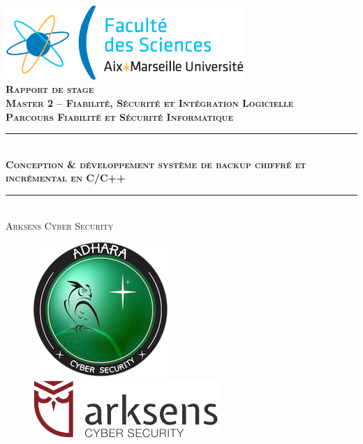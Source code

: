 \documentclass[a4paper,10pt, twoside]{report}
\begin{document}
\begin{spacing}{1.2}
 
\begin{titlepage}
  
  \begin{center}
    \includegraphics[width=9cm]{logo_sciences.png}\\[2cm]
    
    \textsc{\bfseries\Large Rapport de stage\\[0.3cm]
    Master 2 -- Fiabilit\'e, S\'ecurit\'e et
    Int\'egration Logicielle\\[0.3cm]
        Parcours Fiabilit\'e et S\'ecurit\'e Informatique}\\[0.3cm]

    \rule{\linewidth}{1mm} \\[1cm]

    \textsc{\bfseries\huge Conception \&  d\'eveloppement syst\`eme de backup
    chiffr\'e et incr\'emental en C/C++}\\[1cm]

    \rule{\linewidth}{1mm}\\[1.5cm]

    \textsc{\huge Arksens Cyber Security}\\[2cm]
    
    \begin{figure}[H]
      \begin{minipage}[t]{8cm}
        \centering
        \includegraphics[scale=0.50]{logo_adhara.png}
      \end{minipage}
      \begin{minipage}[t]{8cm}
        \centering
        \includegraphics[width=7cm]{logo_arksens.png}
      \end{minipage}\\[1.3cm]
    \end{figure}
      

\end{center}
\end{titlepage}
\end{spacing}
\end{document}
